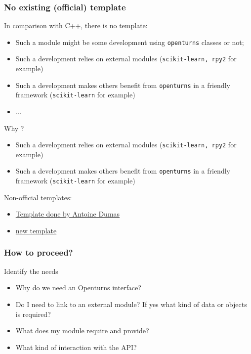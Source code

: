 \documentclass[8pt]{beamer}
\begin{document}
\begin{frame}
  \frametitle{No existing (official) template}
  \begin{block}{}
    In comparison with C++, there is no template: 
    \begin{itemize}
    \item Such a module might be some development using \texttt{openturns} classes or not;
    \item Such a development relies on external modules (\texttt{scikit-learn, rpy2} for example) 
    \item Such a development makes others benefit from \texttt{openturns} in a friendly framework (\texttt{scikit-learn} for example)
    \item $\hdots$
    \end{itemize}
    Why ?
    \begin{itemize}
      \item Such a development relies on external modules (\texttt{scikit-learn, rpy2} for example) 
      \item Such a development makes others benefit from \texttt{openturns} in a friendly framework (\texttt{scikit-learn} for example)
      \end{itemize}
      Non-official templates:
      \begin{itemize}
        \item \href{https://github.com/adumasphi/ottemplatepython}{Template done by Antoine Dumas}
        \item \href{https://github.com/sofianehaddad/ottemplatepython.git}{new template}
        \end{itemize}
  \end{block}
\end{frame}

\begin{frame}
  \frametitle{How to proceed?}
  \begin{block}{Identify the needs}     
    \begin{itemize}
      \item Why do we need an Openturns interface? 
      \item Do I need to link to an external module? If yes what kind of data or objects is required?
      \item What does my module require and provide? 
      \item What kind of interaction with the API?
    \end{itemize}
  \end{block}
\end{frame}
\end{document}
